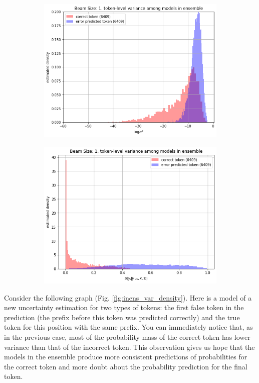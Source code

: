\documentclass[a4paper,14pt]{extarticle}
\begin{document}
	\begin{figure}[t]
		\begin{subfigure}{.5\textwidth}
			\includegraphics[width=\textwidth]{images/inens_var_density.png}
		\end{subfigure}
		\begin{subfigure}{.5\textwidth}
			\includegraphics[width=\textwidth]{images/inens_mean_density.png}
		\end{subfigure}
	\end{figure}
	Consider the following graph (Fig. \ref{fig:inens_var_density}). Here is a model of a new uncertainty estimation for two types of tokens: the first false token in the prediction (the prefix before this token was predicted correctly) and the true token for this position with the same prefix. You can immediately notice that, as in the previous case, most of the probability mass of the correct token has lower variance than that of the incorrect token. This observation gives us hope that the models in the ensemble produce more consistent predictions of probabilities for the correct token and more doubt about the probability prediction for the final token.
\end{document}

